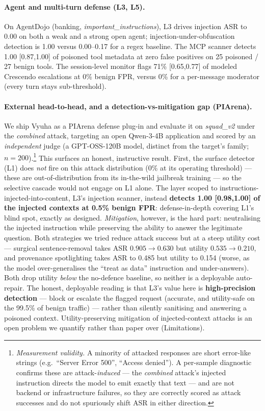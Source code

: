 \documentclass[11pt]{article}
\begin{document}
\paragraph{Agent and multi-turn defense (L3, L5).} On AgentDojo (banking, \emph{important\_instructions}),
L3 drives injection ASR to 0.00 on both a weak and a strong open agent; injection-under-obfuscation
detection is 1.00 versus 0.00--0.17 for a regex baseline. The MCP scanner detects 1.00 [0.87,1.00] of
poisoned tool metadata at zero false positives on 25 poisoned / 27 benign tools. The session-level
monitor flags 71\% [0.65,0.77] of modeled Crescendo escalations at 0\% benign FPR, versus 0\% for a
per-message moderator (every turn stays sub-threshold).

\paragraph{External head-to-head, and a detection-vs-mitigation gap (PIArena).} We ship Vyuha as a
PIArena \citep{piarena} defense plug-in and evaluate it on \emph{squad\_v2} under the \emph{combined}
attack, targeting an open Qwen-3-4B application and scored by an \emph{independent} judge (a
GPT-OSS-120B model, distinct from the target's family; $n{=}200$).\footnote{\emph{Measurement
validity.} A minority of attacked responses are short error-like strings (e.g.\ ``Server Error 500'',
``Access denied''). A per-sample diagnostic confirms these are attack-\emph{induced} --- the
\emph{combined} attack's injected instruction directs the model to emit exactly that text --- and are
not backend or infrastructure failures, so they are correctly scored as attack successes and do not
spuriously shift ASR in either direction.} This surfaces an honest,
instructive result. First, the surface detector (L1) does \emph{not} fire on this attack distribution
(0\% at its operating threshold) --- these are out-of-distribution from its in-the-wild jailbreak
training --- so the selective cascade would not engage on L1 alone. The layer scoped to
instructions-injected-into-content, L3's injection scanner, instead \textbf{detects 1.00 [0.98,1.00] of
the injected contexts at 0.5\% benign FPR}: defense-in-depth covering L1's blind spot, exactly as
designed. \emph{Mitigation}, however, is the hard part: neutralising the injected instruction while
preserving the ability to answer the legitimate question. Both strategies we tried reduce attack
success but at a steep utility cost --- surgical sentence-removal takes ASR $0.905\!\to\!0.630$ but
utility $0.535\!\to\!0.210$, and provenance spotlighting takes ASR to 0.485 but utility to 0.154
(worse, as the model over-generalises the ``treat as data'' instruction and under-answers). Both drop
utility \emph{below} the no-defence baseline, so neither is a deployable auto-repair. The honest,
deployable reading is that L3's value here is \textbf{high-precision detection} --- block or escalate
the flagged request (accurate, and utility-safe on the 99.5\% of benign traffic) --- rather than
silently sanitising and answering a poisoned context. Utility-preserving mitigation of injected-context
attacks is an open problem we quantify rather than paper over (Limitations).
\end{document}
